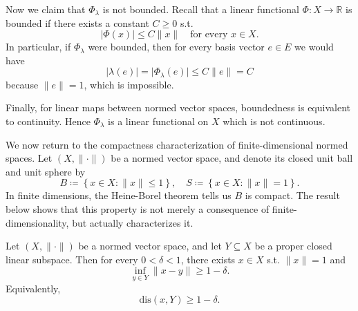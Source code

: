 \begin{eg}
    Now we claim that \(\Phi _\lambda\) is not bounded. Recall that a linear functional \(\Phi :X \to \mathbb{R} \) is bounded if there exists a constant \(C \ge 0\) s.t. 
    \[
        \vert \Phi (x) \vert \le C \lVert x \rVert \quad \text{for every } x \in X. 
    \]   
    In particular, if \(\Phi _\lambda\) were bounded, then for every basis vector \(e \in E\) we would have 
    \[
        \vert \lambda (e) \vert = \vert \Phi _\lambda (e) \vert \le C \lVert e \rVert = C
    \]  
    because \(\lVert e \rVert = 1\), which is impossible. 

    Finally, for linear maps between normed vector spaces, boundedness is equivalent to continuity. Hence \(\Phi _\lambda\) is a linear functional on \(X\) which is not continuous.  
\end{eg}

We now return to the compactness characterization of finite-dimensional normed spaces. Let \((X, \lVert \cdot \rVert )\) be a normed vector space, and denote its closed unit ball and unit sphere by 
\[
    B \coloneqq \left\{ x \in X: \lVert x \rVert \le 1  \right\}, \quad S \coloneqq \left\{ x \in X: \lVert x \rVert = 1  \right\}.  
\] 
In finite dimensions, the Heine-Borel theorem tells us \(B\) is compact. The result below shows that this property is not merely a consequence of finite-dimensionality, but actually characterizes it. 

\begin{lemma}
    Let \((X, \lVert \cdot \rVert )\) be a normed vector space, and let \(Y \subseteq X\) be a proper closed linear subspace. Then for every \(0 < \delta < 1\), there exists \(x \in X\) s.t. \(\lVert x \rVert = 1\) and
    \[
        \inf_{y \in Y} \lVert x - y \rVert \ge 1 - \delta.
    \]
    Equivalently, 
    \[
        \mathrm{dis}(x, Y) \ge 1 - \delta. 
    \]     
\end{lemma}


